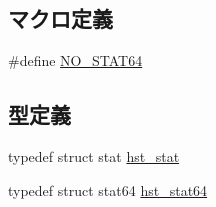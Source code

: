 \subsection*{マクロ定義}
\begin{DoxyCompactItemize}
\item 
\#define \hyperlink{syscall__emul_8hh_a1b37791ed9ed61caf1eafd4c2853c883}{NO\_\-STAT64}
\end{DoxyCompactItemize}
\subsection*{型定義}
\begin{DoxyCompactItemize}
\item 
typedef struct stat \hyperlink{syscall__emul_8hh_a4385fa83cd626df796c087776dd3eaa7}{hst\_\-stat}
\item 
typedef struct stat64 \hyperlink{syscall__emul_8hh_aa03f86fa4319b8ebc18a00641cf30543}{hst\_\-stat64}
\end{DoxyCompactItemize}
